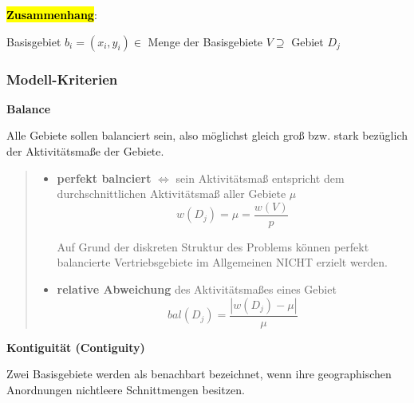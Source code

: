         \par \textbf{\hl{Zusammenhang}}:

        Basisgebiet $b_i = (x_i, y_i) \in $ Menge der Basisgebiete $V \supseteq$ Gebiet $D_j$
        

        \subsubsection{Modell-Kriterien} %
        \label{ssub:modell_kriterien}
          
          \par \textbf{Balance}

          \par Alle Gebiete sollen balanciert sein, also möglichst gleich groß bzw. stark bezüglich der Aktivitätsmaße der Gebiete.

            \begin{quote}
              \begin{itemize}

                \item \textbf{perfekt balnciert} $\Leftrightarrow$ sein Aktivitätsmaß entspricht dem durchschnittlichen Aktivitätsmaß aller Gebiete $\mu$
                \begin{equation}
                  \label{mu}
                  w(D_j) = \mu = \frac{w(V)}{p}
                \end{equation}

                Auf Grund der diskreten Struktur des Problems können perfekt balancierte Vertriebsgebiete im Allgemeinen NICHT erzielt werden.

                \item \textbf{relative Abweichung} des Aktivitätsmaßes eines Gebiet
                \begin{equation*}
                  bal(D_j) = \frac{|w(D_j) - \mu |}{\mu}
                \end{equation*}
              \end{itemize}
            \end{quote}
            

          \par \textbf{Kontiguität (Contiguity)}

          \par Zwei Basisgebiete werden als benachbart bezeichnet, wenn ihre geographischen Anordnungen nichtleere Schnittmengen besitzen.

